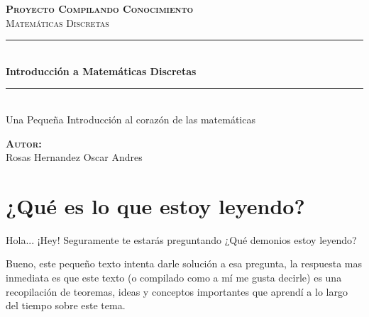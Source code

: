 \documentclass[12pt, fleqn]{report}                             %
\author{Oscar Andrés Rosas}                                     %
\begin{document}
\begin{titlepage}

    \center
    \textbf{\textsc{\Large Proyecto Compilando Conocimiento}}\\[1.0cm] 
    \textsc{\Large Matemáticas Discretas}\\[1.0cm] 

    \rule{\linewidth}{0.5mm} \\[1.0cm]
        { \huge \bfseries Introducción a Matemáticas Discretas }\\[1.0cm] 
    \rule{\linewidth}{0.5mm} \\[2.0cm]
    
    {\LARGE Una Pequeña Introducción al corazón de las matemáticas}\\[7cm] 
    
    \begin{center} \large
    \textbf{\textsc{Autor:}}\\
    Rosas Hernandez Oscar Andres
    \end{center}

    \vfill

\end{titlepage}

\tableofcontents{}
\label{sec:Index}

\clearpage


\section{¿Qué es lo que estoy leyendo?}

    
    Hola... ¡Hey! Seguramente te estarás preguntando
    ¿Qué demonios estoy leyendo?

    Bueno, este pequeño texto intenta darle solución a esa pregunta, la respuesta mas inmediata es
    que este texto (o compilado como a mí me gusta decirle) es una recopilación de teoremas, ideas
    y conceptos importantes que aprendí a lo largo del tiempo sobre este tema.
\end{document}
